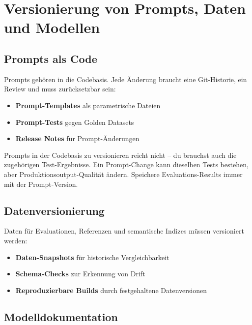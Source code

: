 \section{Versionierung von Prompts, Daten und Modellen}

\subsection{Prompts als Code}
Prompts gehören in die Codebasis. Jede Änderung braucht eine Git-Historie, ein Review und muss zurücksetzbar sein:

\begin{itemize}[leftmargin=*]
    \item \textbf{Prompt-Templates} als parametrische Dateien
    \item \textbf{Prompt-Tests} gegen Golden Datasets
    \item \textbf{Release Notes} für Prompt-Änderungen
\end{itemize}

\begin{praxishinweis}
Prompts in der Codebasis zu versionieren reicht nicht -- du brauchst auch die zugehörigen Test-Ergebnisse. Ein Prompt-Change kann dieselben Tests bestehen, aber Produktionsoutput-Qualität ändern. Speichere Evaluations-Results immer mit der Prompt-Version.
\end{praxishinweis}

\subsection{Datenversionierung}

Daten für Evaluationen, Referenzen und semantische Indizes müssen versioniert werden:

\begin{itemize}[leftmargin=*]
    \item \textbf{Daten-Snapshots} für historische Vergleichbarkeit
    \item \textbf{Schema-Checks} zur Erkennung von Drift
    \item \textbf{Reproduzierbare Builds} durch festgehaltene Datenversionen
\end{itemize}

\subsection{Modelldokumentation}

